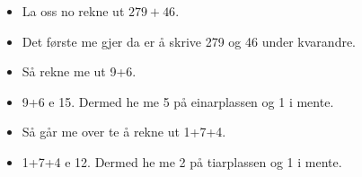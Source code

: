\documentclass[english,hidelinks,pdftex, 11 pt, class=report,crop=false]{standalone}
\begin{document}
\begin{itemize}
\item La oss no rekne ut $ 279+46 $.
\item Det første me gjer da er å skrive 279 og 46 under kvarandre.
\item Så rekne me ut 9+6.
\item 9+6 e 15. Dermed he me 5 på einarplassen og 1 i mente.
\item Så går me over te å rekne ut 1+7+4.
\item 1+7+4 e 12. Dermed he me 2 på tiarplassen og 1 i mente.
\end{itemize}
\end{document}
